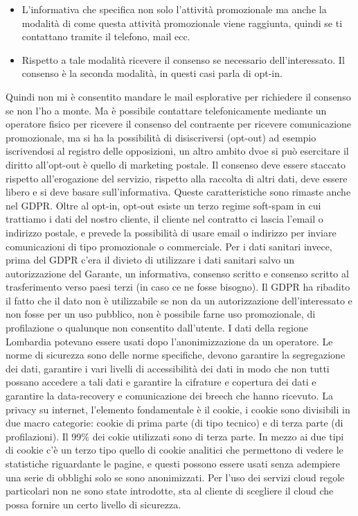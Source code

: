 \documentclass[a4page, 11pt, twocolumn]{article}
\begin{document}
\begin{itemize}
	\item L’informativa che specifica non solo l’attività promozionale ma anche la modalità di come questa attività promozionale viene raggiunta, quindi se ti contattano tramite il telefono, mail ecc. 
	\item Rispetto a tale modalità ricevere il consenso se necessario dell’interessato. Il consenso è la seconda modalità, in questi casi parla di opt-in.
\end{itemize}
Quindi non mi è consentito mandare le mail esplorative per richiedere il consenso se non l’ho a monte. Ma è possibile contattare telefonicamente mediante un operatore fisico per ricevere il consenso del contraente per ricevere comunicazione promozionale, ma si ha la possibilità di disiscriversi (opt-out) ad esempio iscrivendosi al registro delle opposizioni, un altro ambito dvoe si può esercitare il diritto all’opt-out è quello di marketing postale.\newline
Il consenso deve essere staccato rispetto all’erogazione del servizio, rispetto alla raccolta di altri dati, deve essere libero e si deve basare sull’informativa. Queste caratteristiche sono rimaste anche nel GDPR. \newline
Oltre al opt-in, opt-out esiste un terzo regime soft-spam in cui trattiamo i dati del nostro cliente, il cliente nel contratto ci lascia l’email o indirizzo postale, e prevede la possibilità di usare email o indirizzo per inviare comunicazioni di tipo promozionale o commerciale.\newline
Per i dati sanitari invece, prima del GDPR c’era il divieto di utilizzare i dati sanitari salvo un autorizzazione del Garante, un informativa, consenso scritto e consenso scritto al trasferimento verso paesi terzi (in caso ce ne fosse bisogno). Il GDPR ha ribadito il fatto che il dato non è utilizzabile se non da un autorizzazione dell’interessato e non fosse per un uso pubblico, non è possibile farne uso promozionale, di profilazione o qualunque non consentito dall’utente. I dati della regione Lombardia potevano essere usati dopo l’anonimizzazione da un operatore. Le norme di sicurezza sono delle norme specifiche, devono garantire la segregazione dei dati, garantire i vari livelli di accessibilità dei dati in modo che non tutti possano accedere a tali dati e garantire la cifrature e copertura dei dati e garantire la data-recovery e comunicazione dei breech che hanno ricevuto. \newline
La privacy su internet, l’elemento fondamentale è il cookie, i cookie sono divisibili in due macro categorie: cookie di prima parte (di tipo tecnico) e di terza parte (di profilazioni). Il 99\% dei cokie utilizzati sono di terza parte. In mezzo ai due tipi di cookie c’è un terzo tipo quello di cookie analitici che permettono di vedere le statistiche riguardante le pagine, e questi possono essere usati senza adempiere una serie di obblighi solo se sono anonimizzati. Per l’uso dei servizi cloud regole particolari non ne sono state introdotte, sta al cliente di scegliere il cloud che possa fornire un certo livello di sicurezza.\newline
\end{document}
